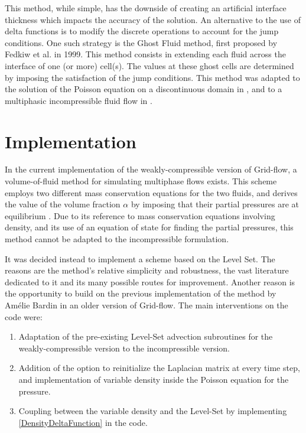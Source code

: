 \documentclass[11pt, a4paper, oneside, openany]{book}
\begin{document}
This method, while simple, has the downside of creating an artificial interface thickness which impacts the accuracy of the solution.
An alternative to the use of delta functions is to modify the discrete operations to account for the jump conditions. One such strategy is the Ghost Fluid method, first proposed by Fedkiw et al. \cite{fedkiw1999non} in 1999. This method consists in extending each fluid across the interface of one (or more) cell(s). The values at these ghost cells are determined by imposing the satisfaction of the jump conditions. This method was adapted to the solution of the Poisson equation on a discontinuous domain in \cite{liu2000boundary}, and to a multiphasic incompressible fluid flow in \cite{kang2000boundary}. 

\chapter{Implementation}\label{Chapter_Implementation}
In the current implementation of the weakly-compressible version of Grid-flow, a volume-of-fluid method for simulating multiphase flows exists. This scheme employs two different mass conservation equations for the two fluids, and derives the value of the volume fraction $\alpha$ by imposing that their partial pressures are at equilibrium \cite{Li2020}. Due to its reference to mass conservation equations involving density, and its use of an equation of state for finding the partial pressures, this method cannot be adapted to the incompressible formulation.\par
It was decided instead to implement a scheme based on the Level Set. The reasons are the method's relative simplicity and robustness, the vast literature dedicated to it and its many possible routes for improvement. Another reason is the opportunity to build on the previous implementation of the method by Am{\'{e}}lie Bardin \cite{Bardin2015} in an older version of Grid-flow.
The main interventions on the code were:
\begin{enumerate}
	\item Adaptation of the pre-existing Level-Set advection subroutines for the weakly-compressible version to the incompressible version. 
	\item Addition of the option to reinitialize the Laplacian matrix at every time step, and implementation of variable density inside the Poisson equation for the pressure.
	\item Coupling between the variable density and the Level-Set by implementing \eqref{DensityDeltaFunction} in the code.
\end{enumerate} 
\end{document}
